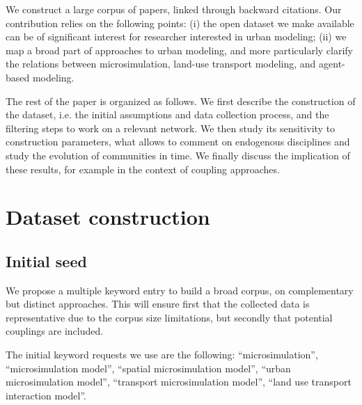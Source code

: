 
We construct a large corpus of papers, linked through backward citations.
Our contribution relies on the following points: (i) the open dataset we make available can be of significant interest for researcher interested in urban modeling; (ii) we map a broad part of approaches to urban modeling, and more particularly clarify the relations between microsimulation, land-use transport modeling, and agent-based modeling.


The rest of the paper is organized as follows. We first describe the construction of the dataset, i.e. the initial assumptions and data collection process, and the filtering steps to work on a relevant network. We then study its sensitivity to construction parameters, what allows to comment on endogenous disciplines and study the evolution of communities in time. We finally discuss the implication of these results, for example in the context of coupling approaches.


\section*{Dataset construction}

\subsection*{Initial seed}

We propose a multiple keyword entry to build a broad corpus, on complementary but distinct approaches. This will ensure first that the collected data is representative due to the corpus size limitations, but secondly that potential couplings are included. %

The initial keyword requests we use are the following: ``microsimulation'', ``microsimulation model'', ``spatial microsimulation model'', ``urban microsimulation model'', ``transport microsimulation model'', ``land use transport interaction model''.


